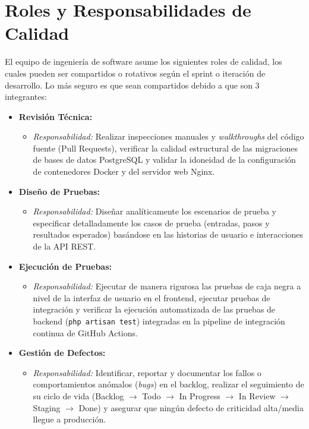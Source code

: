 \section{Roles y Responsabilidades de Calidad}

El equipo de ingeniería de software asume los siguientes roles de calidad, los cuales pueden ser compartidos o rotativos según el sprint o iteración de desarrollo. Lo más seguro es que sean compartidos debido a que son 3 integrantes:

\begin{itemize}
    \item \textbf{Revisión Técnica:}
    \begin{itemize}
        \item \textit{Responsabilidad:} Realizar inspecciones manuales y \textit{walkthroughs} del código fuente (Pull Requests), verificar la calidad estructural de las migraciones de bases de datos PostgreSQL y validar la idoneidad de la configuración de contenedores Docker y del servidor web Nginx.
    \end{itemize}
    
    \item \textbf{Diseño de Pruebas:}
    \begin{itemize}
        \item \textit{Responsabilidad:} Diseñar analíticamente los escenarios de prueba y especificar detalladamente los casos de prueba (entradas, pasos y resultados esperados) basándose en las historias de usuario e interacciones de la API REST.
    \end{itemize}
    
    \item \textbf{Ejecución de Pruebas:}
    \begin{itemize}
        \item \textit{Responsabilidad:} Ejecutar de manera rigurosa las pruebas de caja negra a nivel de la interfaz de usuario en el frontend, ejecutar pruebas de integración y verificar la ejecución automatizada de las pruebas de backend (\texttt{php artisan test}) integradas en la pipeline de integración continua de GitHub Actions.
    \end{itemize}
    
    \item \textbf{Gestión de Defectos:}
    \begin{itemize}
        \item \textit{Responsabilidad:} Identificar, reportar y documentar los fallos o comportamientos anómalos (\textit{bugs}) en el backlog, realizar el seguimiento de su ciclo de vida (Backlog $\rightarrow$ Todo $\rightarrow$ In Progress $\rightarrow$ In Review $\rightarrow$ Staging $\rightarrow$ Done) y asegurar que ningún defecto de criticidad alta/media llegue a producción.
    \end{itemize}
    

\end{itemize}
